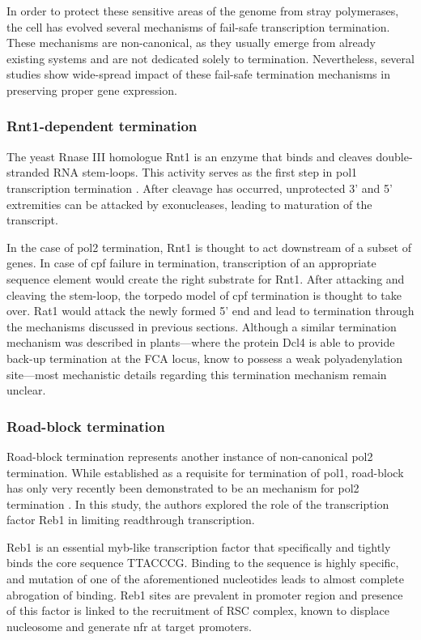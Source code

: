 In order to protect these sensitive areas of the genome from stray polymerases, the cell has evolved several mechanisms of fail-safe transcription termination.
These mechanisms are non-canonical, as they usually emerge from already existing systems and are not dedicated solely to termination.
Nevertheless, several studies show wide-spread impact of these fail-safe termination mechanisms in preserving proper gene expression.

\subsubsection{Rnt1-dependent termination}

The yeast Rnase III homologue Rnt1 is an enzyme that binds and cleaves double-stranded RNA stem-loops. 
This activity serves as the first step in \gls{pol1} transcription termination .
After cleavage has occurred, unprotected 3' and 5' extremities can be attacked by exonucleases, leading to maturation of the transcript.

In the case of \gls{pol2} termination, Rnt1 is thought to act downstream of a subset of genes.
In case of \gls{cpf} failure in termination, transcription of an appropriate sequence element would create the right substrate for Rnt1.
After attacking and cleaving the stem-loop, the torpedo model of \gls{cpf} termination is thought to take over.
Rat1 would attack the newly formed 5' end and lead to termination through the mechanisms discussed in previous sections.
Although a similar termination mechanism was described in plants---where the protein Dcl4 is able to provide back-up termination at the FCA locus, know to possess a weak polyadenylation site---most mechanistic details regarding this termination mechanism remain unclear.

\subsubsection{Road-block termination}
  
Road-block termination represents another instance of non-canonical \gls{pol2} termination.
While established as a requisite for termination of \gls{pol1}, road-block has only very recently been demonstrated to be an \invivo{} mechanism for \gls{pol2} termination \cite{colin:2014:roadblock}.
In this study, the authors explored the role of the transcription factor Reb1 in limiting readthrough transcription.

Reb1 is an essential myb-like transcription factor that specifically and tightly binds the core sequence TTACCCG.
Binding to the sequence is highly specific, and mutation of one of the aforementioned nucleotides leads to almost complete abrogation of binding.
Reb1 sites are prevalent in promoter region and presence of this factor is linked to the recruitment of RSC complex, known to displace nucleosome and generate \gls{nfr} at target promoters.

